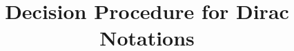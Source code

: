 \documentclass[manuscript, review, timestamp]{acmart}
\begin{document}
\title{Decision Procedure for Dirac Notations}



\begin{abstract}
\end{abstract}



\maketitle
\end{document}
